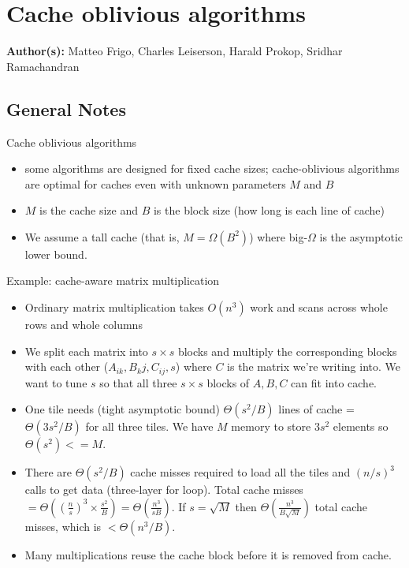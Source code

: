 \section{Cache oblivious algorithms}

\textbf{Author(s):} Matteo Frigo, Charles Leiserson, Harald Prokop, Sridhar Ramachandran

\subsection{General Notes}

Cache oblivious algorithms
\begin{itemize}
    \item some algorithms are designed for fixed cache sizes; cache-oblivious algorithms are optimal for caches even with unknown parameters $M$ and $B$
    \item $M$ is the cache size and $B$ is the block size (how long is each line of cache)
    \item We assume a tall cache (that is, $M = \Omega(B^2)$) where big-$\Omega$ is the asymptotic lower bound. 
\end{itemize}

Example: cache-aware matrix multiplication
\begin{itemize}
    \item Ordinary matrix multiplication takes $O(n^3)$ work and scans across whole rows and whole columns
    \item We split each matrix into $s\times s$ blocks and multiply the corresponding blocks with each other ($A_{ik}, B{_kj}, C_{ij}, s$) where $C$ is the matrix we're writing into. We want to tune $s$ so that all three $s\times s$ blocks of $A, B, C$ can fit into cache.
    \item One tile needs (tight asymptotic bound) $\Theta(s^2/B)$ lines of cache = $\Theta(3s^2/B)$ for all three tiles. We have $M$ memory to store $3s^2$ elements so $\Theta(s^2) <= M$. 
    \item There are $\Theta(s^2/B)$ cache misses required to load all the tiles and $(n/s)^3$ calls to get data (three-layer for loop). Total cache misses $= \Theta((\frac{n}{s})^3 \times \frac{s^2}{B}) = \Theta(\frac{n^3}{sB})$. If $s = \sqrt{M}$ then $\Theta(\frac{n^3}{B\sqrt{M}})$ total cache misses, which is $< \Theta(n^3/B)$.
    \item Many multiplications reuse the cache block before it is removed from cache.
\end{itemize}

